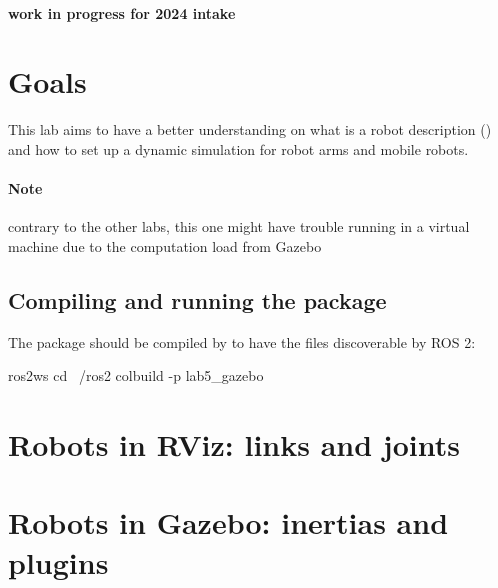 \documentclass{ecnreport}
\author{O. Kermorgant}
\begin{document}


\paragraph{work in progress for 2024 intake}

\section{Goals}

This lab aims to have a better understanding on what is a robot description () and how to set up a dynamic simulation for robot arms and mobile robots.

\paragraph{Note} contrary to the other labs, this one might have trouble running in a virtual machine due to the computation load from Gazebo

\subsection*{Compiling and running the package}

The package should be compiled by  to have the files discoverable by ROS 2:
\begin{bashcodelarge}
 ros2ws
 cd ~/ros2
 colbuild -p lab5_gazebo
\end{bashcodelarge}


\section{Robots in RViz: links and joints}


\section{Robots in Gazebo: inertias and plugins}
\end{document}
